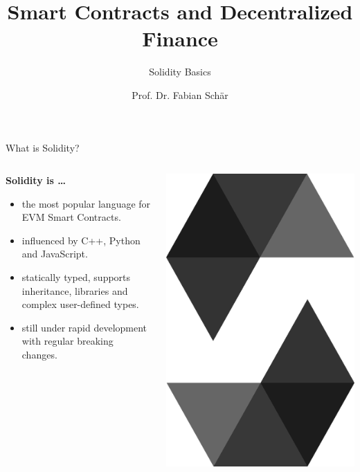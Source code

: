 \documentclass[handout]{beamer}
\title{Smart Contracts and Decentralized Finance}
\subtitle{Solidity Basics}
\author{Prof. Dr. Fabian Schär}
\institute{University of Basel}
\begin{document}
\thispagestyle{empty}
\begin{frame}[noframenumbering]
	\titlepage
\end{frame}

\begin{frame}{What is Solidity?}

\begin{columns}[T]
	\begin{column}{0.7\textwidth}
		\textbf{Solidity is \dots}
			\begin{itemize}
			\item<1-> the most popular language for EVM Smart Contracts.
				\item<2-> influenced by C++, Python and JavaScript.
				\item<3-> statically typed, supports inheritance, libraries and complex user-defined types.
				\item<4-> still under rapid development with regular breaking changes.
			\end{itemize}
	\end{column}
	\begin{column}{0.3\textwidth}
	\center
			\includegraphics[scale=0.04]{../assets/images/solidity_logo_new}
	\end{column}
\end{columns}	


\end{frame}
\end{document}
